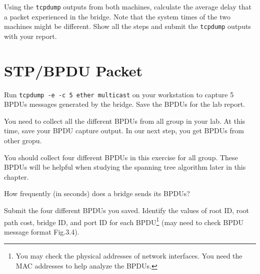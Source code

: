 \documentclass{../UTNetLab}
\begin{document}
    Using the \lstinline{tcpdump} outputs from both machines, calculate the average delay that a packet experienced in the bridge.
    Note that the system times of the two machines might be different.
    Show all the steps and submit the \lstinline{tcpdump} outputs with your report.


\section{STP/BPDU Packet}
    Run \lstinline{tcpdump -e -c 5 ether multicast} on your workstation to capture 5 BPDUs messages generated by the bridge.
    Save the BPDUs for the lab report.

    You need to collect all the different BPDUs from all group in your lab.
    At this time, save your BPDU capture output. 
    In our next step,  you get BPDUs from other gropu.

    You should collect four different BPDUs in this exercise for all group.
    These BPDUs will be helpful when studying the spanning tree algorithm later in this chapter.

    \begin{report}
    \item How frequently (in seconds) does a bridge sends its BPDUs?

    \item Submit the four different BPDUs you saved.
    Identify the values of root ID, root path cost, bridge ID, and port ID for each BPDU\footnote{You may check the physical addresses of network interfaces. You need the MAC addresses to help analyze the BPDUs.} (may need to check BPDU message format Fig.3.4).
    \end{report}
\end{document}
